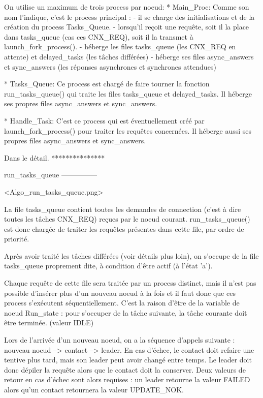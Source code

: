 On utilise un maximum de trois process par noeud:
    * Main_Proc:
      Comme son nom l'indique, c'est le process principal :
        - il se charge des initialisations et de la création du process Tasks_Queue.
        - lorsqu'il reçoit une requête, soit il la place dans tasks_queue (cas ces CNX_REQ), soit il la transmet à
          launch_fork_process().
        - héberge les files tasks_queue (les CNX_REQ en attente) et delayed_tasks (les tâches différées)
        - héberge ses files async_answers et sync_answers (les réponses asynchrones et synchrones attendues)

    * Tasks_Queue:
      Ce process est chargé de faire tourner la fonction run_tasks_queue() qui traite les files tasks_queue et
      delayed_tasks.
      Il héberge ses propres files async_answers et sync_answers.

    * Handle_Task:
      C'est ce process qui est éventuellement créé par launch_fork_process() pour traiter les requêtes concernées.
      Il héberge aussi ses propres files async_answers et sync_answers.

Dans le détail.
***************

run_tasks_queue
---------------

<Algo_run_tasks_queue.png>

La file tasks_queue contient toutes les demandes de connection (c'est à dire toutes les tâches CNX_REQ) reçues par le
noeud courant. run_tasks_queue() est donc chargée de traiter les requêtes présentes dans cette file, par ordre de
priorité.

Après avoir traité les tâches différées (voir détails plus loin), on s'occupe de la file tasks_queue proprement dite, à
condition d'être actif (à l'état 'a').

Chaque requête de cette file sera traitée par un process distinct, mais il n'est pas possible d'insérer plus d'un
nouveau noeud à la fois et il faut donc que ces process s'exécutent séquentiellement. C'est la raison d'être de la
variable de noeud Run_state : pour s'occuper de la tâche suivante, la tâche courante doit être terminée. (valeur IDLE)

Lors de l'arrivée d'un nouveau noeud, on a la séquence d'appels suivante : nouveau noeud --> contact --> leader. En cas
d'échec, le contact doit refaire une tentive plus tard, mais son leader peut avoir changé entre temps. Le leader doit
donc dépiler la requête alors que le contact doit la conserver. Deux valeurs de retour en cas d'échec sont alors
requises : un leader retourne la valeur FAILED alors qu'un contact retournera la valeur UPDATE_NOK.


